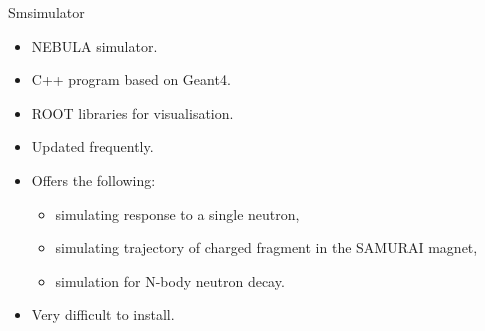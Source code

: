 \documentclass[11pt]{beamer}
\begin{document}
\begin{frame}{Smsimulator}
    \begin{itemize}
        \item<tri@1-> NEBULA simulator.
        \vspace{0.2 cm}
        \item<tri@1-> C++ program based on Geant4.
        \vspace{0.2 cm}
        \item<tri@1-> ROOT libraries for visualisation.
        \vspace{0.2 cm}
        \item<tri@1-> Updated frequently.
        \vspace{0.2 cm}
        \item<tri@1-> Offers the following:
        \vspace{0.2 cm}
        \begin{itemize}
            \item<square@1-> simulating response to a single neutron,
            \vspace{0.2 cm}
            \item<square@1-> simulating trajectory of charged fragment in the SAMURAI magnet,
            \vspace{0.2 cm}
            \item<square@1-> simulation for N-body neutron decay.
        \end{itemize}
        \vspace{0.2 cm}
        \item<tri@1-> Very difficult to install.
    \end{itemize}    
\end{frame}
\end{document}
